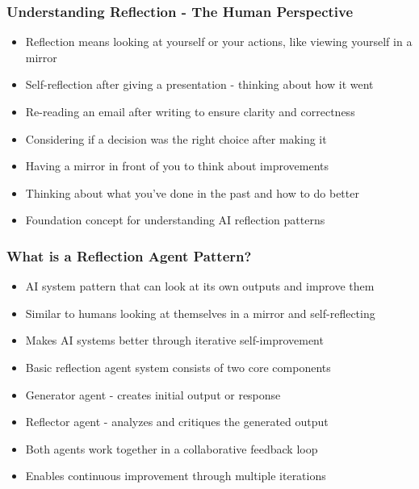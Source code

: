 \begin{frame}[fragile]\frametitle{Understanding Reflection - The Human Perspective}
      \begin{itemize}
        \item Reflection means looking at yourself or your actions, like viewing yourself in a mirror
        \item Self-reflection after giving a presentation - thinking about how it went
        \item Re-reading an email after writing to ensure clarity and correctness
        \item Considering if a decision was the right choice after making it
        \item Having a mirror in front of you to think about improvements
        \item Thinking about what you've done in the past and how to do better
        \item Foundation concept for understanding AI reflection patterns
      \end{itemize}
\end{frame}
\begin{frame}[fragile]\frametitle{What is a Reflection Agent Pattern?}
      \begin{itemize}
        \item AI system pattern that can look at its own outputs and improve them
        \item Similar to humans looking at themselves in a mirror and self-reflecting
        \item Makes AI systems better through iterative self-improvement
        \item Basic reflection agent system consists of two core components
        \item Generator agent - creates initial output or response
        \item Reflector agent - analyzes and critiques the generated output
        \item Both agents work together in a collaborative feedback loop
        \item Enables continuous improvement through multiple iterations
      \end{itemize}
\end{frame}

